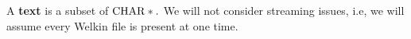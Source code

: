 


A \textbf{text} is a subset of $\mathrm{CHAR}*.$ We will not consider streaming issues, i.e, we will assume every Welkin file is present at one time.

